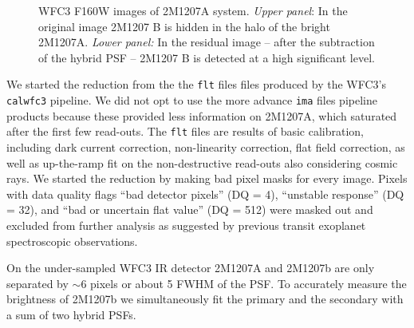 \documentclass[apj]{emulateapj}
\newcommand{\ima}{\texttt{ima} files }
\newcommand{\flt}{\texttt{flt} files }
\begin{document}

\begin{figure}
  \centering
  \caption{WFC3 F160W images of 2M1207A system. {\em Upper panel}: In the original image 
    2M1207 B is hidden in the halo of the bright 2M1207A.   {\em Lower panel:} In the residual image -- after the subtraction of the hybrid PSF -- 2M1207 B is detected at a high significant level.}
  \label{fig:1}
\end{figure}


We started the reduction from the the \flt files produced by the WFC3's \texttt{calwfc3} pipeline. We did not opt to use the more advance \ima pipeline products because these provided less information on 2M1207A, which saturated after the first few read-outs. 
The \flt are results of basic calibration, including dark current correction, non-linearity
correction, flat field correction, as well as up-the-ramp fit on the non-destructive read-outs also considering cosmic rays. We started the reduction by making bad pixel masks for every
image. Pixels with data quality flags ``bad detector pixels'' (DQ = 4),
``unstable response'' (DQ = 32), and ``bad or uncertain flat value'' (DQ =
512) were masked out and excluded from further analysis as suggested
by previous transit exoplanet
spectroscopic observations\citep[e.g.][]{Berta2012, Kreidberg2014}.


On the under-sampled WFC3 IR detector 2M1207A and 2M1207b are only separated by $\sim6$ pixels or about 5 FWHM of the PSF. To accurately measure the brightness of 2M1207b we simultaneously fit the primary and the secondary with a sum of two hybrid PSFs. 
\end{document}
